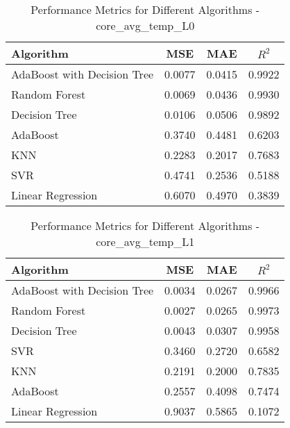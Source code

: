 \documentclass[conference]{IEEEtran}
\begin{document}
\begin{table}[ht]
	\centering
	\caption{Performance Metrics for Different Algorithms - core\_avg\_temp\_L0}
	\label{tab:core_avg_temp_L0}
	\begin{tabular}{lccc}
		\toprule
		\textbf{Algorithm} & \textbf{MSE} & \textbf{MAE} & \textbf{\(R^2\)} \\
		\midrule
		AdaBoost with Decision Tree & 0.0077 & 0.0415 & 0.9922 \\
		Random Forest & 0.0069 & 0.0436 & 0.9930 \\
		Decision Tree & 0.0106 & 0.0506 & 0.9892 \\
		AdaBoost & 0.3740 & 0.4481 & 0.6203 \\
		KNN & 0.2283 & 0.2017 & 0.7683 \\
		SVR & 0.4741 & 0.2536 & 0.5188 \\
		Linear Regression & 0.6070 & 0.4970 & 0.3839 \\
		\bottomrule
	\end{tabular}
\end{table}

\begin{table}[ht]
	\centering
	\caption{Performance Metrics for Different Algorithms - core\_avg\_temp\_L1}
	\label{tab:core_avg_temp_L1}
	\begin{tabular}{lccc}
		\toprule
		\textbf{Algorithm} & \textbf{MSE} & \textbf{MAE} & \textbf{\(R^2\)} \\
		\midrule
		AdaBoost with Decision Tree & 0.0034 & 0.0267 & 0.9966 \\
		Random Forest & 0.0027 & 0.0265 & 0.9973 \\
		Decision Tree & 0.0043 & 0.0307 & 0.9958 \\
		SVR & 0.3460 & 0.2720 & 0.6582 \\
		KNN & 0.2191 & 0.2000 & 0.7835 \\
		AdaBoost & 0.2557 & 0.4098 & 0.7474 \\
		Linear Regression & 0.9037 & 0.5865 & 0.1072 \\
		\bottomrule
	\end{tabular}
\end{table}
\end{document}
